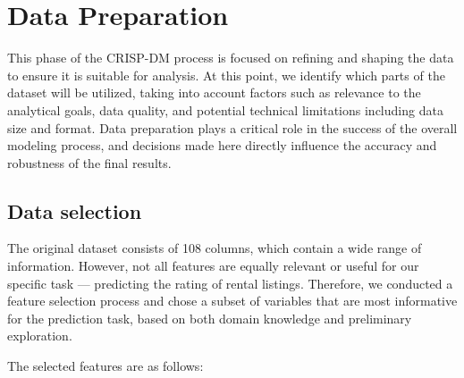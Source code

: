 \section{Data Preparation}
\label{chap:dataPreparation}
This phase of the CRISP-DM process is focused on refining and shaping the data to ensure it is suitable for analysis. At this point, we identify which parts of the dataset will be utilized, taking into account factors such as relevance to the analytical goals, data quality, and potential technical limitations including data size and format. Data preparation plays a critical role in the success of the overall modeling process, and decisions made here directly influence the accuracy and robustness of the final results.

\subsection{Data selection } 
\label{sec:dataSelection}
The original dataset consists of 108 columns, which contain a wide range of information. However, not all features are equally relevant or useful for our specific task — predicting the rating of rental listings. Therefore, we conducted a feature selection process and chose a subset of variables that are most informative for the prediction task, based on both domain knowledge and preliminary exploration.

The selected features are as follows:

